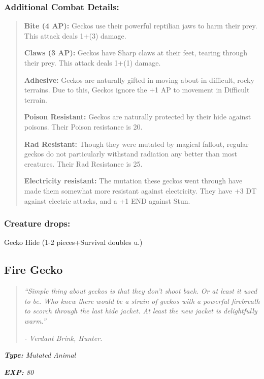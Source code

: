 \documentclass[11pt,a4paper,twocolumn]{book}
\begin{document}
	\subsubsection*{Additional Combat Details:}
	\begin{verse}
		\textbf{Bite (4 AP):} Geckos use their powerful reptilian jaws to harm their prey. This attack deals 1+(3) damage.
		
		\textbf{Claws (3 AP):} Geckos have Sharp claws at their feet, tearing through their prey. This attack deals 1+(1) damage.  
		
		\textbf{Adhesive:} Geckos are naturally gifted in moving about in difficult, rocky terrains. Due to this, Geckos ignore the +1 AP to movement in Difficult terrain.
		
		\textbf{Poison Resistant:} Geckos are naturally protected by their hide against poisons. Their Poison resistance is 20.
		
		\textbf{Rad Resistant:} Though they were mutated by magical fallout, regular geckos do not particularly withstand radiation any better than most creatures. Their Rad Resistance is 25.
		
		\textbf{Electricity resistant:} The mutation these geckos went through have made them somewhat more resistant against electricity. They have +3 DT against electric attacks, and a +1 END against Stun.
	\end{verse}
	
	\subsubsection*{Creature drops:}
	Gecko Hide (1-2 pieces+Survival doubles u.)
	
	\vfill
	\subsection*{Fire Gecko}
	\begin{quote}
		\emph{``Simple thing about geckos is that they don't shoot back. Or at least it used to be. Who knew there would be a strain of geckos with a powerful firebreath to scorch through the last hide jacket. At least the new jacket is delightfully warm.''}
		
		\emph{- Verdant Brink, Hunter.}
	\end{quote}
	
	\emph{\textbf{Type:} Mutated Animal}
	
	\emph{\textbf{EXP:} 80}
	
\end{document}
